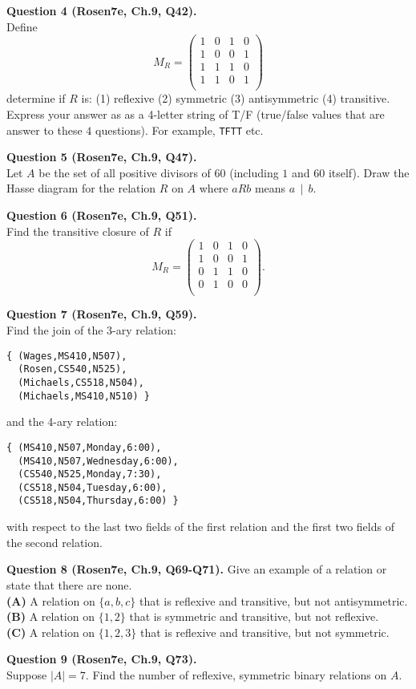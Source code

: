 \documentclass[jou]{apa6}
\begin{document}
\vspace{6pt}
{\bf Question 4 (Rosen7e, Ch.9, Q42).}\\
Define
$$M_R = \left( \begin{array}{cccc}
1 & 0 & 1 & 0 \\
1 & 0 & 0 & 1 \\
1 & 1 & 1 & 0 \\
1 & 1 & 0 & 1 \\
\end{array} \right)$$
determine if $R$ is: (1) reflexive (2) symmetric (3) antisymmetric (4) transitive.
Express your answer as as a 4-letter string of T/F (true/false values that are 
answer to these $4$ questions). For example, 
{\tt TFTT} etc.


\vspace{6pt}
{\bf Question 5 (Rosen7e, Ch.9, Q47).}\\
Let $A$ be the set of all positive divisors of $60$ (including $1$ and $60$ itself). 
Draw the Hasse diagram for the relation $R$ on $A$ where $aRb$ means $a\,\mid\,b$.

\vspace{6pt}
{\bf Question 6 (Rosen7e, Ch.9, Q51).}\\
Find the transitive closure of $R$ if 
$$M_R  = \left( \begin{array}{cccc}
1 & 0 & 1 & 0 \\
1 & 0 & 0 & 1 \\
0 & 1 & 1 & 0 \\
0 & 1 & 0 & 0 \\
\end{array} \right).$$

\vspace{6pt}
{\bf Question 7 (Rosen7e, Ch.9, Q59).}\\
Find the join of the 3-ary relation:
\begin{verbatim}
{ (Wages,MS410,N507),
  (Rosen,CS540,N525),
  (Michaels,CS518,N504),
  (Michaels,MS410,N510) }
\end{verbatim}
and the 4-ary relation:
\begin{verbatim}
{ (MS410,N507,Monday,6:00), 
  (MS410,N507,Wednesday,6:00), 
  (CS540,N525,Monday,7:30),
  (CS518,N504,Tuesday,6:00), 
  (CS518,N504,Thursday,6:00) }
\end{verbatim}
with respect to the last two fields of the first relation and 
the first two fields of the second relation. 

\vspace{6pt}
{\bf Question 8 (Rosen7e, Ch.9, Q69-Q71).}
Give an example of a relation or state that there are none.\\
{\bf (A)} A relation on $\{a, b, c\}$ that is reflexive and transitive, but not antisymmetric.\\
{\bf (B)} A relation on $\{1, 2\}$ that is symmetric and transitive, but not reflexive.\\
{\bf (C)} A relation on $\{1, 2, 3\}$ that is reflexive and transitive, but not symmetric.

\vspace{6pt}
{\bf Question 9 (Rosen7e, Ch.9, Q73).}\\
Suppose $|A| = 7$. Find the number of reflexive, symmetric binary relations on $A$.
\end{document}
